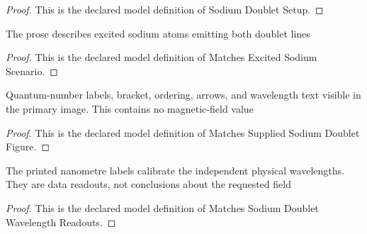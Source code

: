 \begin{proof}
  This is the declared model definition of Sodium Doublet Setup.
\end{proof}
\begin{definition}
  \label{def:physics:phyx-mini-0578:phyxminiproblems-problemphyxmini0578-matchesexcitedsodiumscenario}
  The prose describes excited sodium atoms emitting both doublet lines
\end{definition}
\begin{proof}
  This is the declared model definition of Matches Excited Sodium Scenario.
\end{proof}
\begin{definition}
  \label{def:physics:phyx-mini-0578:phyxminiproblems-problemphyxmini0578-matchessuppliedsodiumdoubletfigure}
  Quantum-number labels, bracket, ordering, arrows, and wavelength text visible in the primary image. This contains no magnetic-field value
\end{definition}
\begin{proof}
  This is the declared model definition of Matches Supplied Sodium Doublet Figure.
\end{proof}
\begin{definition}
  \label{def:physics:phyx-mini-0578:phyxminiproblems-problemphyxmini0578-matchessodiumdoubletwavelengthreadouts}
  The printed nanometre labels calibrate the independent physical wavelengths. They are data readouts, not conclusions about the requested field
\end{definition}
\begin{proof}
  This is the declared model definition of Matches Sodium Doublet Wavelength Readouts.
\end{proof}
